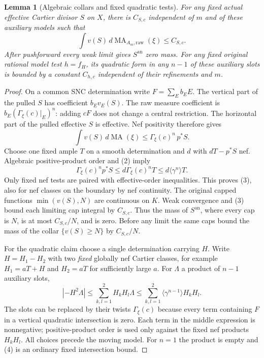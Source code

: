 \documentclass[11pt]{article}
\newtheorem{lemma}[theorem]{Lemma}
\newcommand{\MA}{\operatorname{MA}}
\begin{document}
\begin{lemma}[Algebraic collars and fixed quadratic tests]\label{collars}
For any fixed actual effective Cartier divisor $S$ on $X$, there is
$C_{S,c}$ independent of $m$ and of these auxiliary models such that
\[
 \int v(S)\,d\MA_{A_m,\mathrm{raw}}(\xi)\leq C_{S,c}.     \tag{3}
\]
After pushforward every weak limit gives $S^{\mathrm{an}}$ zero mass.
For any fixed original rational model test $h=f_H$, its quadratic form
in any $n-1$ of these auxiliary slots is bounded by a constant
$C_{h,c}$ independent of their refinements and $m$.
\end{lemma}
\begin{proof}
On a common SNC determination write $F=\sum_Eb_EE$.
The vertical part of the pulled $S$ has coefficient $b_Ev_E(S)$.
The raw measure coefficient is $b_E(\Gamma_\xi(c)|_E)^n$:
adding $cF$ does not change a central restriction.
The horizontal part of the pulled effective $S$ is effective.
Nef positivity therefore gives
\[
 \int v(S)\,d\MA(\xi)
 \leq \Gamma_\xi(c)^n\,p^*S.
\]
Choose one fixed ample $T$ on a smooth determination and $d$ with
$dT-p^*S$ nef. Algebraic positive-product order and (2) imply
\[
 \Gamma_\xi(c)^n p^*S
 \leq d\Gamma_\xi(c)^n T
 \leq d\langle\gamma^n\rangle T .
\]
Only fixed nef tests are paired with effective-order inequalities.
This proves (3), also for nef classes on the boundary by nef continuity.
The original capped functions $\min(v(S),N)$ are continuous on $K$.
Weak convergence and (3) bound each limiting cap integral by $C_{S,c}$.
Thus the mass of $S^{\mathrm{an}}$, where every cap is $N$, is at most
$C_{S,c}/N$, and is zero. Before any limit the same caps bound the
mass of the collar $\{v(S)\geq N\}$ by $C_{S,c}/N$.

For the quadratic claim choose a single determination carrying $H$.
Write $H=H_1-H_2$ with two \emph{fixed} globally nef Cartier classes,
for example $H_1=aT+H$ and $H_2=aT$ for sufficiently large $a$.
For $\Lambda$ a product of $n-1$ auxiliary slots,
\[
 |-H^2\Lambda|
 \leq\sum_{k,l=1}^2 H_kH_l\Lambda
 \leq\sum_{k,l=1}^2\langle\gamma^{n-1}\rangle H_kH_l .
                                                               \tag{4}
\]
The slots can be replaced by their twists $\Gamma_\xi(c)$ because
every term containing $F$ in a vertical quadratic intersection is zero.
Each term in the middle expression is nonnegative; positive-product
order is used only against the fixed nef products $H_kH_l$.
All choices precede the moving model. For $n=1$ the product is empty
and (4) is an ordinary fixed intersection bound.
\end{proof}
\end{document}
